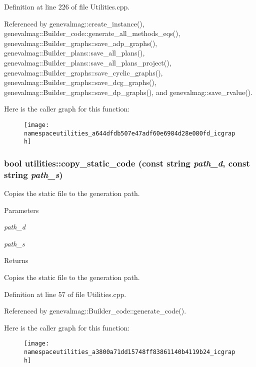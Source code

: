 Definition at line 226 of file Utilities.cpp.



Referenced by genevalmag::create\_\-instance(), genevalmag::Builder\_\-code::generate\_\-all\_\-methods\_\-eqs(), genevalmag::Builder\_\-graphs::save\_\-adp\_\-graphs(), genevalmag::Builder\_\-plans::save\_\-all\_\-plans(), genevalmag::Builder\_\-plans::save\_\-all\_\-plans\_\-project(), genevalmag::Builder\_\-graphs::save\_\-cyclic\_\-graphs(), genevalmag::Builder\_\-graphs::save\_\-dcg\_\-graphs(), genevalmag::Builder\_\-graphs::save\_\-dp\_\-graphs(), and genevalmag::save\_\-rvalue().



Here is the caller graph for this function:\nopagebreak
\begin{figure}[H]
\begin{center}
\leavevmode
\texttt{[image: namespaceutilities\_a644dfdb507e47adf60e6984d28e080fd\_icgraph]}
\end{center}
\end{figure}


\hypertarget{namespaceutilities_a3800a71dd15748ff83861140b4119b24}{
\subsubsection[{copy\_\-static\_\-code}]{\setlength{\rightskip}{0pt plus 5cm}bool utilities::copy\_\-static\_\-code (const string {\em path\_\-d}, \/  const string {\em path\_\-s})}}
\label{namespaceutilities_a3800a71dd15748ff83861140b4119b24}
Copies the static file to the generation path. 
\begin{DoxyParams}{Parameters}
\item[{\em path\_\-d}]\item[{\em path\_\-s}]\end{DoxyParams}
\begin{DoxyReturn}{Returns}

\end{DoxyReturn}
Copies the static file to the generation path. 

Definition at line 57 of file Utilities.cpp.



Referenced by genevalmag::Builder\_\-code::generate\_\-code().



Here is the caller graph for this function:\nopagebreak
\begin{figure}[H]
\begin{center}
\leavevmode
\texttt{[image: namespaceutilities\_a3800a71dd15748ff83861140b4119b24\_icgraph]}
\end{center}
\end{figure}


